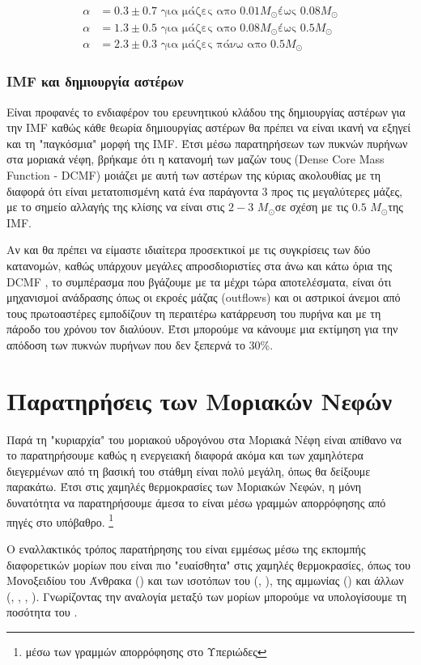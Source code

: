 \documentclass[a4paper,12pt]{memoir}
\newcommand{\sm}{$M_{\odot}$}
\begin{document}
\begin{align}
\alpha&=0.3 \pm 0.7 \text{ για μάζες απο $0.01$\sm έως $0.08$\sm} \\
\alpha&=1.3 \pm 0.5 \text{ για μάζες απο $0.08$\sm έως $0.5$\sm} \\
\alpha&=2.3 \pm 0.3 \text{ για μάζες πάνω απο $0.5$\sm}
\end{align}

\subsubsection{IMF και δημιουργία αστέρων}
Είναι προφανές το ενδιαφέρον του ερευνητικού κλάδου της δημιουργίας αστέρων για την IMF καθώς κάθε θεωρία δημιουργίας αστέρων θα πρέπει να είναι ικανή να εξηγεί και τη "παγκόσμια" μορφή της IMF.
Έτσι μέσω παρατηρήσεων των πυκνών πυρήνων στα μοριακά νέφη, βρήκαμε ότι η κατανομή των μαζών τους (Dense Core Mass Function - DCMF) μοιάζει με αυτή των αστέρων της κύριας ακολουθίας με τη διαφορά ότι είναι μετατοπισμένη κατά ένα παράγοντα $3$ προς τις μεγαλύτερες μάζες, με το σημείο αλλαγής της κλίσης να είναι στις $2-3$ \sm σε σχέση με τις $0.5$ \sm της IMF. 

Αν και θα πρέπει να είμαστε ιδιαίτερα προσεκτικοί με τις συγκρίσεις των δύο κατανομών, καθώς υπάρχουν μεγάλες απροσδιοριστίες στα άνω και κάτω όρια της DCMF \cite{polychroni__2010}, το συμπέρασμα που βγάζουμε με τα μέχρι τώρα αποτελέσματα, είναι ότι μηχανισμοί ανάδρασης όπως οι εκροές μάζας (outflows) και οι αστρικοί άνεμοι από τους πρωτοαστέρες εμποδίζουν τη περαιτέρω κατάρρευση του πυρήνα και με τη πάροδο του χρόνου τον διαλύουν. Έτσι μπορούμε να κάνουμε μια εκτίμηση για την απόδοση των πυκνών πυρήνων που δεν ξεπερνά το 30\%.

\section{Παρατηρήσεις των Μοριακών Νεφών}
\label{par:H2}
Παρά τη "κυριαρχία" του μοριακού υδρογόνου στα Μοριακά Νέφη είναι απίθανο να το παρατηρήσουμε καθώς η ενεργειακή διαφορά ακόμα και των χαμηλότερα διεγερμένων από τη βασική του στάθμη είναι πολύ μεγάλη, όπως θα δείξουμε παρακάτω. Έτσι στις χαμηλές θερμοκρασίες των Μοριακών Νεφών, η μόνη δυνατότητα να παρατηρήσουμε άμεσα το  είναι μέσω γραμμών απορρόφησης από πηγές στο υπόβαθρο. \footnote{μέσω των γραμμών απορρόφησης στο Υπεριώδες} 

Ο εναλλακτικός τρόπος παρατήρησης του  είναι εμμέσως μέσω της εκπομπής διαφορετικών μορίων που είναι πιο "ευαίσθητα" στις χαμηλές θερμοκρασίες, όπως του Μονοξειδίου του Άνθρακα () και των ισοτόπων του (, ), της αμμωνίας () και άλλων (, , , ).
Γνωρίζοντας την αναλογία μεταξύ των μορίων μπορούμε να υπολογίσουμε τη ποσότητα του .
\end{document}
